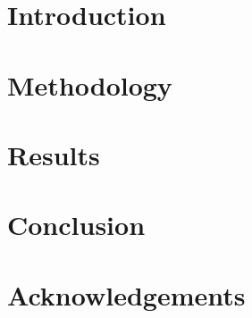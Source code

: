 \documentclass{article}
\begin{document}

\newpage

\newpage
\tableofcontents

\newpage
\section{Introduction}

\section{Methodology}

\section{Results}\label{section:results}

\section{Conclusion}

\section{Acknowledgements}


\newpage
\printbibliography
\end{document}
